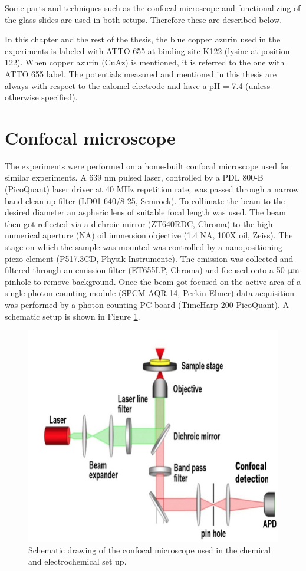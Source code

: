 \documentclass[twoside,single]{lion-msc}
\begin{document}
Some parts and techniques such as the confocal microscope and functionalizing of the glass slides are used in both setups. Therefore these are described below.

In this chapter and the rest of the thesis, the blue copper azurin used in the experiments is  labeled with ATTO 655 at binding site K122 (lysine at position 122). When copper azurin (CuAz) is mentioned, it is referred to the one with ATTO 655 label.
The potentials measured and mentioned in this thesis are always with respect to the calomel electrode and have a pH = 7.4 (unless otherwise specified).


\section*{Confocal microscope}  \label{confo_micro}
The experiments were performed on a home-built confocal microscope used for similar experiments. A 639 nm pulsed laser, controlled by a PDL 800-B (PicoQuant) laser driver at 40 MHz repetition rate, was passed through a narrow band clean-up filter (LD01-640/8-25, Semrock). To collimate the beam to the desired diameter an aspheric lens of suitable focal length was used. The beam then got reflected via a dichroic mirror (ZT640RDC, Chroma) to the high numerical aperture (NA) oil immersion objective (1.4 NA, 100X oil, Zeiss). The stage on which the sample was mounted was controlled by a nanopositioning piezo element (P517.3CD, Physik Instrumente). The emission was collected and filtered through an emission filter (ET655LP, Chroma) and focused onto a 50 $\upmu \textup{m}$ pinhole to remove background. Once the beam got focused on the active area of a single-photon counting module (SPCM-AQR-14, Perkin Elmer) data acquisition was performed by a photon counting PC-board (TimeHarp 200 PicoQuant). A schematic setup is shown in Figure \ref{micros}.

\begin{figure}[ht!]
\centering
\includegraphics[width=.5\textwidth]{schem_micros}
\caption{Schematic drawing of the confocal microscope used in the chemical and electrochemical set up. }
\label{micros}
\end{figure}
\end{document}
